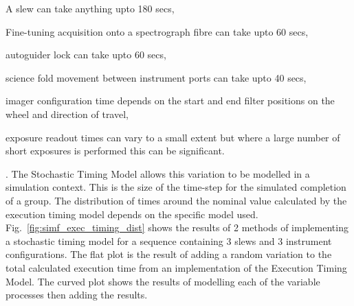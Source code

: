 \begin{inparaenum} \item A slew can take anything upto 180 secs, \item Fine-tuning acquisition onto a spectrograph fibre can take upto 60 secs, \item autoguider lock can take upto 60 secs, \item science fold movement between instrument ports can take upto 40 secs, \item imager configuration time depends on the start and end filter positions on the wheel and direction of travel, \item exposure readout times can vary to a small extent but where a large number of short exposures is performed this can be significant.\end{inparaenum}.
The Stochastic Timing Model allows this variation to be modelled in a simulation context. This is the size of the time-step for the simulated completion of a group. The distribution of times around the nominal value calculated by the execution timing model  depends on the specific model used. Fig.~\ref{fig:simf_exec_timing_dist} shows the results of 2 methods of implementing a stochastic timing model for a sequence containing 3 slews and 3 instrument configurations. The flat plot is the result of adding a random variation to the total calculated execution time from an implementation of the Execution Timing Model. The curved plot shows the results of modelling each of the variable processes then adding the results.

